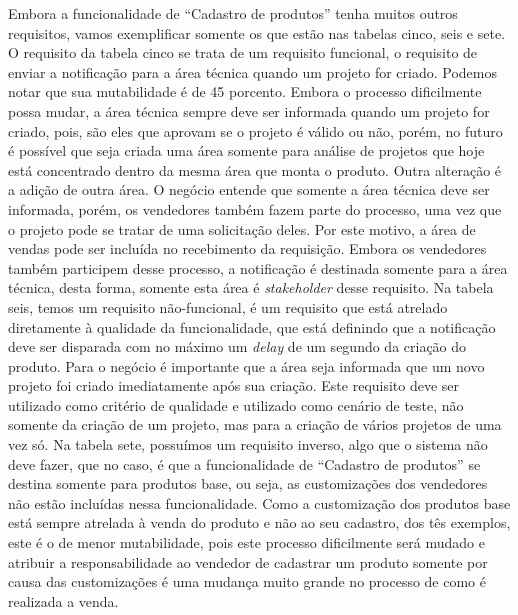       Embora a funcionalidade de “Cadastro de produtos” tenha muitos outros requisitos,
      vamos exemplificar somente os que estão nas tabelas cinco, seis e sete.
      O requisito da tabela cinco se trata de um requisito funcional, o requisito de
      enviar a notificação para a área técnica quando um projeto for criado. Podemos
      notar que sua mutabilidade é de 45 porcento. Embora o processo dificilmente possa mudar,
      a área técnica sempre deve ser informada quando um projeto for criado, pois,
      são eles que aprovam se o projeto é válido ou não, porém, no futuro é possível
      que seja criada uma área somente para análise de projetos que hoje está
      concentrado dentro da mesma área que monta o produto. Outra alteração é a
      adição de outra área. O negócio entende que somente a área técnica deve
      ser informada, porém, os vendedores também fazem parte do processo, uma vez que
      o projeto pode se tratar de uma solicitação deles. Por este motivo, a área de
      vendas pode ser incluída no recebimento da requisição. Embora os vendedores
      também participem desse processo, a notificação é destinada somente para a área
      técnica, desta forma, somente esta área é \textit{stakeholder} desse
      requisito. Na tabela seis, temos um requisito não-funcional, é um requisito
      que está atrelado diretamente à qualidade da funcionalidade, que está definindo
      que a notificação deve ser disparada com no máximo um \textit{delay} de um
      segundo da criação do produto. Para o negócio é importante que a área seja
      informada que um novo projeto foi criado imediatamente após sua criação. Este
      requisito deve ser utilizado como critério de qualidade e utilizado como cenário
      de teste, não somente da criação de um projeto, mas para a criação de vários
      projetos de uma vez só. Na tabela sete, possuímos um requisito inverso, algo
      que o sistema não deve fazer, que no caso, é que a funcionalidade de “Cadastro
      de produtos” se destina somente para produtos base, ou seja, as customizações
      dos vendedores não estão incluídas nessa funcionalidade. Como a customização
      dos produtos base está sempre atrelada à venda do produto e não ao seu cadastro,
      dos tês exemplos, este é o de menor mutabilidade, pois este processo dificilmente
      será mudado e atribuir a responsabilidade ao vendedor de cadastrar um produto
      somente por causa das customizações é uma mudança muito grande no processo
      de como é realizada a venda.

